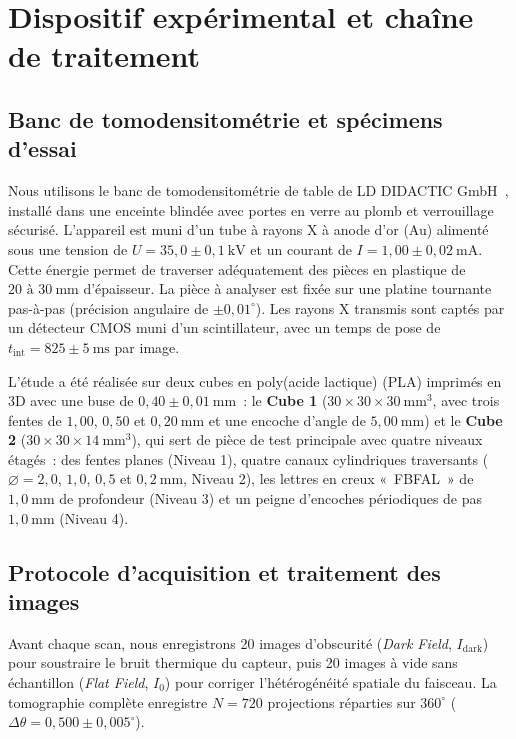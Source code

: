 \section{Dispositif expérimental et chaîne de traitement}
\label{sec:methodologie}

\subsection{Banc de tomodensitométrie et spécimens d'essai}
Nous utilisons le banc de tomodensitométrie de table de LD DIDACTIC GmbH~\cite{lddidactic2020}, installé dans une enceinte blindée avec portes en verre au plomb et verrouillage sécurisé. L'appareil est muni d'un tube à rayons X à anode d'or (Au) alimenté sous une tension de $U = 35{,}0 \pm 0{,}1~\text{kV}$ et un courant de $I = 1{,}00 \pm 0{,}02~\text{mA}$. Cette énergie permet de traverser adéquatement des pièces en plastique de $20 \text{ à } 30~\text{mm}$ d'épaisseur. La pièce à analyser est fixée sur une platine tournante pas-à-pas (précision angulaire de $\pm 0{,}01^\circ$). Les rayons X transmis sont captés par un détecteur CMOS muni d'un scintillateur, avec un temps de pose de $t_{\text{int}} = 825 \pm 5~\text{ms}$ par image.

L'étude a été réalisée sur deux cubes en poly(acide lactique) (PLA) imprimés en 3D avec une buse de $0{,}40 \pm 0{,}01~\text{mm}$~: le \textbf{Cube 1} ($30 \times 30 \times 30~\text{mm}^3$, avec trois fentes de $1{,}00$, $0{,}50$ et $0{,}20~\text{mm}$ et une encoche d'angle de $5{,}00~\text{mm}$) et le \textbf{Cube 2} ($30 \times 30 \times 14~\text{mm}^3$), qui sert de pièce de test principale avec quatre niveaux étagés~: des fentes planes (Niveau 1), quatre canaux cylindriques traversants ($\varnothing = 2{,}0$, $1{,}0$, $0{,}5$ et $0{,}2~\text{mm}$, Niveau 2), les lettres en creux «~FBFAL~» de $1{,}0~\text{mm}$ de profondeur (Niveau 3) et un peigne d'encoches périodiques de pas $1{,}0~\text{mm}$ (Niveau 4).

\subsection{Protocole d'acquisition et traitement des images}
Avant chaque scan, nous enregistrons 20 images d'obscurité (\emph{Dark Field}, $I_{\text{dark}}$) pour soustraire le bruit thermique du capteur, puis 20 images à vide sans échantillon (\emph{Flat Field}, $I_0$) pour corriger l'hétérogénéité spatiale du faisceau. La tomographie complète enregistre $N = 720$ projections réparties sur $360^\circ$ ($\Delta \theta = 0{,}500 \pm 0{,}005^\circ$).

